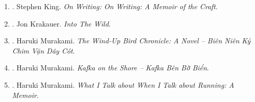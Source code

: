 \documentclass{article}
\begin{document}
\begin{enumerate}
	\item \cite{King2000, King2010}. Stephen King. {\it On Writing: On Writing: A Memoir of the Craft}.\hfill{\sf[done]}
	
	\item \cite{Krakauer_wild}. {\sc Jon Krakauer}. {\it Into The Wild}.
	
	\item \cite{Murakami_bird_VN}. {\sc Haruki Murakami}. {\it The Wind-Up Bird Chronicle: A Novel -- Biên Niên Ký Chim Vặn Dây Cót}.\hfill{\sf[done]}
	
	\item \cite{Murakami_Kafka_VN}. {\sc Haruki Murakami}. {\it Kafka on the Shore -- Kafka Bên Bờ Biển}.\hfill{\sf[done]}
	
	\item \cite{Murakami_run}. {\sc Haruki Murakami}. {\it What I Talk about When I Talk about Running: A Memoir}. {}
	

\end{enumerate}
\end{document}
